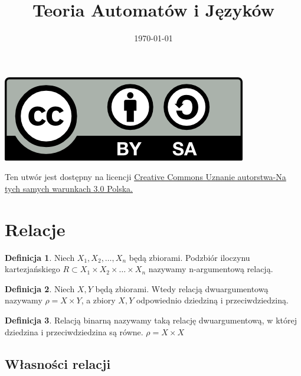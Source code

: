 \documentclass[12pt,a4paper]{article}
\theoremstyle{definition}
\newtheorem{df}{Definicja}
\theoremstyle{remark}
\begin{document}
\title{ Teoria Automatów i Języków}
\author{\vspace{-5ex}}
\date{\today}
\maketitle
\tableofcontents

\begin{center}
\leavevmode

\vfill

\includegraphics[width=1 in]{by-sa.png}
\end{center}
\label{fig:cc}
\scriptsize{Ten utwór jest dostępny na licencji  
\href{http://creativecommons.org/licenses/by-sa/3.0/pl/}{Creative Commons Uznanie autorstwa-Na tych samych warunkach 3.0 Polska.}}

\pagebreak

\section{Relacje}

\begin{df}
Niech $X_1, X_2, \dots, X_n$ będą zbiorami. Podzbiór iloczynu kartezjańskiego $R \subset X_1 \times X_2 \times \dots \times X_n$ 
nazywamy n-argumentową relacją. 
\end{df}

\begin{df}
Niech $X, Y$ będą zbiorami. Wtedy relacją dwuargumentową nazywamy $\rho = X \times Y$, a zbiory $X, Y$ odpowiednio dziedziną i przeciwdziedziną.  
\end{df}

\begin{df}
Relacją binarną nazywamy taką relację dwuargumentową, w której dziedzina i przeciwdziedzina są równe. $\rho = X \times X$
\end{df}

\subsection{Własności relacji}
\end{document}
